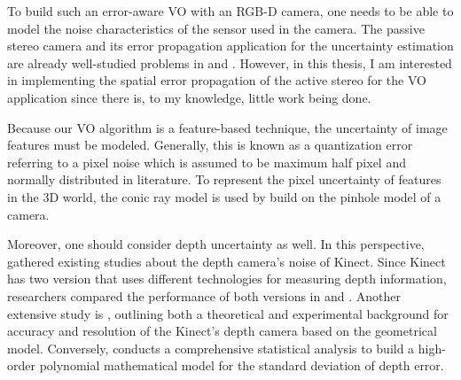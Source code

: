 \documentclass[12pt]{report}
\numberwithin{figure}{section}
\begin{document}
To build such an error-aware VO with an RGB-D camera, one needs to be able to
model the noise characteristics of the sensor used in the camera. The passive
stereo camera and its error propagation application for the uncertainty
estimation are already well-studied problems in \parencite{Leo2011} and
\parencite{Miura1993AnUM}.
However, in this thesis, I am interested in implementing the spatial error
propagation of the active stereo for the VO application since there is, to my
knowledge, little work being done.

Because our VO algorithm is a feature-based technique, the uncertainty of image
features must be modeled.  Generally, this is known as a quantization error
referring to a pixel noise \parencite{RichardHartley2003} which is assumed to 
be
maximum half pixel and normally distributed in literature.  To represent the
pixel uncertainty of features in the 3D world, the conic ray model
\parencite{Sola2007a} is used by build on the pinhole model of a camera.

Moreover, one should consider depth uncertainty as well. In this perspective,
\parencite{Mallick2014b} gathered existing studies about the depth
camera's noise of Kinect. Since Kinect has two version that uses different
technologies for measuring depth information, researchers compared the
performance of both versions in \parencite{Wasenmuller2017b} and 
\parencite{Kinect2015}.
Another extensive study is \parencite{Khoshelham2012a}, outlining both a 
theoretical
and experimental background for accuracy and resolution of the Kinect's depth
camera based on the geometrical model.  Conversely, \parencite{Choo2014} 
conducts a
comprehensive statistical analysis to build a high-order polynomial
mathematical model for the standard deviation of depth error.
\end{document}
